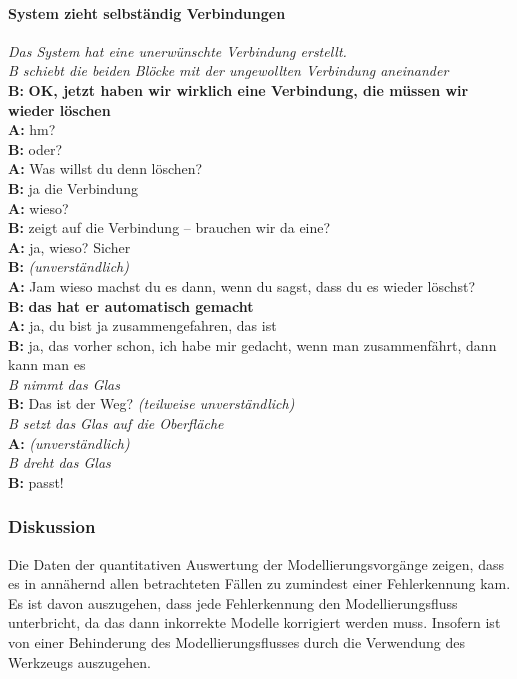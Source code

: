 \paragraph{System zieht selbständig Verbindungen}

\begin{transkript}
\emph{Das System hat eine unerwünschte Verbindung erstellt.} \\
\emph{B schiebt die beiden Blöcke mit der ungewollten Verbindung aneinander} \\
\textbf{B:} \textbf{OK, jetzt haben wir wirklich eine Verbindung, die müssen wir wieder löschen} \\
\textbf{A:} hm? \\
\textbf{B:} oder? \\
\textbf{A:} Was willst du denn löschen? \\
\textbf{B:} ja die Verbindung \\
\textbf{A:} wieso? \\
\textbf{B:} zeigt auf die Verbindung – brauchen wir da eine? \\
\textbf{A:} ja, wieso? Sicher \\
\textbf{B:} \emph{(unverständlich)} \\
\textbf{A:} Jam wieso machst du es dann, wenn du sagst, dass du es wieder löschst? \\
\textbf{B:} \textbf{das hat er automatisch gemacht} \\
\textbf{A:} ja, du bist ja zusammengefahren, das ist \\
\textbf{B:} ja, das vorher schon, ich habe mir gedacht, wenn man zusammenfährt, dann kann man es \\
\emph{B nimmt das Glas} \\
\textbf{B:} Das ist der Weg? \emph{(teilweise unverständlich)} \\
\emph{B setzt das Glas auf die Oberfläche} \\
\textbf{A:} \emph{(unverständlich)} \\
\emph{B dreht das Glas} \\
\textbf{B:} passt! \\
\end{transkript}

\subsubsection{Diskussion} 

Die Daten der quantitativen Auswertung der Modellierungsvorgänge zeigen, dass es in annähernd allen betrachteten Fällen zu zumindest einer Fehlerkennung kam. Es ist davon auszugehen, dass jede Fehlerkennung den Modellierungsfluss unterbricht, da das dann inkorrekte Modelle korrigiert werden muss. Insofern ist von einer Behinderung des Modellierungsflusses durch die Verwendung des Werkzeugs auszugehen.

